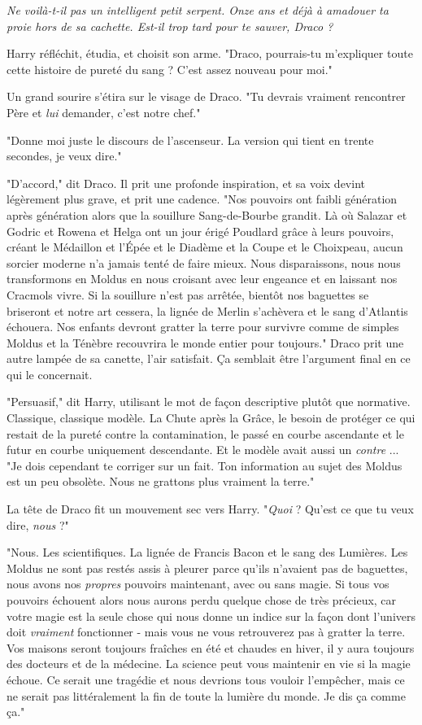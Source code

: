 \emph{Ne voilà-t-il pas un intelligent petit serpent. Onze ans et déjà à amadouer ta proie hors de sa cachette. Est-il trop tard pour te sauver, Draco ?} 

Harry réfléchit, étudia, et choisit son arme. "Draco, pourrais-tu m'expliquer toute cette histoire de pureté du sang ? C'est assez nouveau pour moi."

Un grand sourire s'étira sur le visage de Draco. "Tu devrais vraiment rencontrer Père et \emph{lui}  demander, c'est notre chef."

"Donne moi juste le discours de l'ascenseur. La version qui tient en trente secondes, je veux dire."

"D'accord," dit Draco. Il prit une profonde inspiration, et sa voix devint légèrement plus grave, et prit une cadence. "Nos pouvoirs ont faibli génération après génération alors que la souillure Sang-de-Bourbe grandit. Là où Salazar et Godric et Rowena et Helga ont un jour érigé Poudlard grâce à leurs pouvoirs, créant le Médaillon et l'Épée et le Diadème et la Coupe et le Choixpeau, aucun sorcier moderne n'a jamais tenté de faire mieux. Nous disparaissons, nous nous transformons en Moldus en nous croisant avec leur engeance et en laissant nos Cracmols vivre. Si la souillure n'est pas arrêtée, bientôt nos baguettes se briseront et notre art cessera, la lignée de Merlin s'achèvera et le sang d'Atlantis échouera. Nos enfants devront gratter la terre pour survivre comme de simples Moldus et la Ténèbre recouvrira le monde entier pour toujours." Draco prit une autre lampée de sa canette, l'air satisfait. Ça semblait être l'argument final en ce qui le concernait.

"Persuasif," dit Harry, utilisant le mot de façon descriptive plutôt que normative. Classique, classique modèle. La Chute après la Grâce, le besoin de protéger ce qui restait de la pureté contre la contamination, le passé en courbe ascendante et le futur en courbe uniquement descendante. Et le modèle avait aussi un \emph{contre} ... "Je dois cependant te corriger sur un fait. Ton information au sujet des Moldus est un peu obsolète. Nous ne grattons plus vraiment la terre."

La tête de Draco fit un mouvement sec vers Harry. "\emph{Quoi}  ? Qu'est ce que tu veux dire, \emph{nous}  ?"

"Nous. Les scientifiques. La lignée de Francis Bacon et le sang des Lumières. Les Moldus ne sont pas restés assis à pleurer parce qu'ils n'avaient pas de baguettes, nous avons nos \emph{propres}  pouvoirs maintenant, avec ou sans magie. Si tous vos pouvoirs échouent alors nous aurons perdu quelque chose de très précieux, car votre magie est la seule chose qui nous donne un indice sur la façon dont l'univers doit \emph{vraiment}  fonctionner - mais vous ne vous retrouverez pas à gratter la terre. Vos maisons seront toujours fraîches en été et chaudes en hiver, il y aura toujours des docteurs et de la médecine. La science peut vous maintenir en vie si la magie échoue. Ce serait une tragédie et nous devrions tous vouloir l'empêcher, mais ce ne serait pas littéralement la fin de toute la lumière du monde. Je dis ça comme ça."

